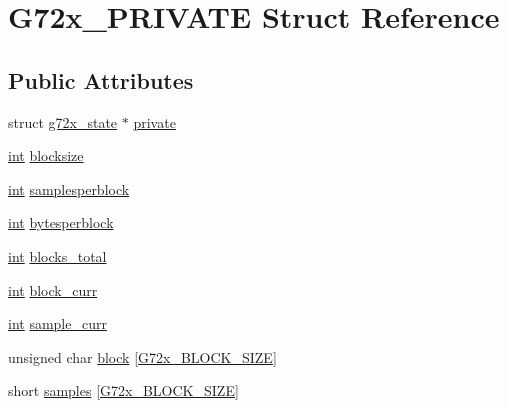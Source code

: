 \hypertarget{struct_g72x___p_r_i_v_a_t_e}{}\section{G72x\+\_\+\+P\+R\+I\+V\+A\+TE Struct Reference}
\label{struct_g72x___p_r_i_v_a_t_e}
\subsection*{Public Attributes}
\begin{DoxyCompactItemize}
\item 
struct \hyperlink{structg72x__state}{g72x\+\_\+state} $\ast$ \hyperlink{struct_g72x___p_r_i_v_a_t_e_aba551111945bdb20e43779ce1efc5454}{private}
\item 
\hyperlink{xmltok_8h_a5a0d4a5641ce434f1d23533f2b2e6653}{int} \hyperlink{struct_g72x___p_r_i_v_a_t_e_afc4e3f647aa96c0adf9c47d3175112c8}{blocksize}
\item 
\hyperlink{xmltok_8h_a5a0d4a5641ce434f1d23533f2b2e6653}{int} \hyperlink{struct_g72x___p_r_i_v_a_t_e_a9fb2ff31332b422f68088dc62727d313}{samplesperblock}
\item 
\hyperlink{xmltok_8h_a5a0d4a5641ce434f1d23533f2b2e6653}{int} \hyperlink{struct_g72x___p_r_i_v_a_t_e_a2356cb08ae055a24d8c487f979ab16dc}{bytesperblock}
\item 
\hyperlink{xmltok_8h_a5a0d4a5641ce434f1d23533f2b2e6653}{int} \hyperlink{struct_g72x___p_r_i_v_a_t_e_a4d3d80c9d2c5db28ef600fa7dd654686}{blocks\+\_\+total}
\item 
\hyperlink{xmltok_8h_a5a0d4a5641ce434f1d23533f2b2e6653}{int} \hyperlink{struct_g72x___p_r_i_v_a_t_e_a7ea654b4348cc1652bacbf107921679c}{block\+\_\+curr}
\item 
\hyperlink{xmltok_8h_a5a0d4a5641ce434f1d23533f2b2e6653}{int} \hyperlink{struct_g72x___p_r_i_v_a_t_e_af8f5f66228fb32e7f536baa1f65a61d9}{sample\+\_\+curr}
\item 
unsigned char \hyperlink{struct_g72x___p_r_i_v_a_t_e_a19e547b1d7c570c5b3b0cde2dd605172}{block} \mbox{[}\hyperlink{g72x_8h_a99147e891150b4a6cebf6394fa60f209}{G72x\+\_\+\+B\+L\+O\+C\+K\+\_\+\+S\+I\+ZE}\mbox{]}
\item 
short \hyperlink{struct_g72x___p_r_i_v_a_t_e_ab5dfa16f7fdc58697fe6b92da394ad46}{samples} \mbox{[}\hyperlink{g72x_8h_a99147e891150b4a6cebf6394fa60f209}{G72x\+\_\+\+B\+L\+O\+C\+K\+\_\+\+S\+I\+ZE}\mbox{]}
\end{DoxyCompactItemize}


